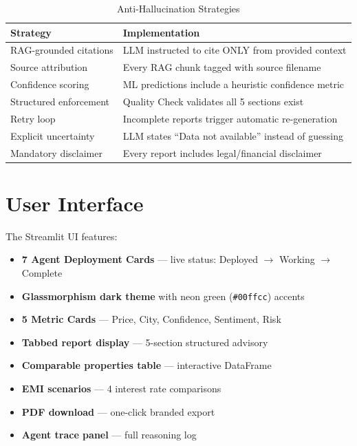 \documentclass[12pt,a4paper]{article}
\begin{document}
\begin{table}[H]\centering
\caption{Anti-Hallucination Strategies}
\begin{tabular}{@{}lp{8cm}@{}}
\toprule
\textbf{Strategy} & \textbf{Implementation} \\
\midrule
RAG-grounded citations & LLM instructed to cite ONLY from provided context \\
Source attribution & Every RAG chunk tagged with source filename \\
Confidence scoring & ML predictions include a heuristic confidence metric \\
Structured enforcement & Quality Check validates all 5 sections exist \\
Retry loop & Incomplete reports trigger automatic re-generation \\
Explicit uncertainty & LLM states ``Data not available'' instead of guessing \\
Mandatory disclaimer & Every report includes legal/financial disclaimer \\
\bottomrule
\end{tabular}
\end{table}

\section{User Interface}

The Streamlit UI features:
\begin{itemize}[noitemsep]
    \item \textbf{7 Agent Deployment Cards} — live status: Deployed $\rightarrow$ Working $\rightarrow$ Complete
    \item \textbf{Glassmorphism dark theme} with neon green (\texttt{\#00ffcc}) accents
    \item \textbf{5 Metric Cards} — Price, City, Confidence, Sentiment, Risk
    \item \textbf{Tabbed report display} — 5-section structured advisory
    \item \textbf{Comparable properties table} — interactive DataFrame
    \item \textbf{EMI scenarios} — 4 interest rate comparisons
    \item \textbf{PDF download} — one-click branded export
    \item \textbf{Agent trace panel} — full reasoning log
\end{itemize}
\end{document}
